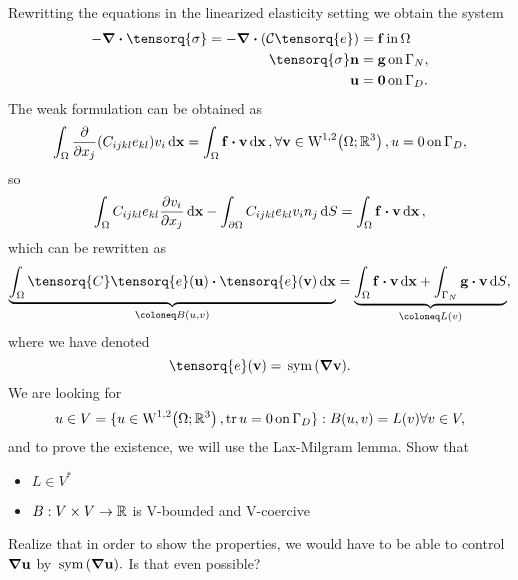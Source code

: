 \documentclass[reqno, a4paper]{article}
\begin{document}
Rewritting the equations in the linearized elasticity setting we obtain the system
\begin{align*}
	-\divergence{\tensorq{\sigma}} = - \divergence{\qty(\mathcal{C}\tensorq{e})} &= \vb{f} \, \text{in} \, \Omega \\
	\tensorq{\sigma}\vb{n} &= \vb{g} \, \text{on} \, \Gamma_{N}, \\
	\vb{u} &= \vb{0} \, \text{on} \, \Gamma_{D}.
\end{align*}
The weak formulation can be obtained as
\[
	\int_{\Omega} \pdv{x_j}\qty(C_{ijkl}e_{kl})v_i \dd{\vb{x}} = \int_{\Omega}\vb{f}\vdot \vb{v}\dd{\vb{x}}, \forall \vb{v} \in \WkpSet[1][2]{\Omega;\R^3}, u=0 \, \text{on} \, \Gamma_D,
\]
so
\[
	\int_{\Omega}C_{ijkl}e_{kl} \pdv{v_i}{x_j}\dd{\vb{x}}-\int_{\partial \Omega}C_{ijkl}e_{kl}v_i n_j \dd{S} = \int_{\Omega}\vb{f}\vdot \vb{v}\dd{\vb{x}},
\]
which can be rewritten as
\[
	\underbrace{\int_{\Omega}\tensorq{C}\tensorq{e}\qty(\vb{u}) \vdot \tensorq{e}\qty(\vb{v})\dd{\vb{x}}}_{\coloneq B\qty(u,v)} = \underbrace{\int_{\Omega}\vb{f} \vdot \vb{v}\dd{\vb{x}} + \int_{\Gamma_N}\vb{g}\vdot \vb{v}\dd{S}}_{\coloneq L(v)},
\]
where we have denoted
\[
	\tensorq{e}\qty(\vb{v}) = \, \text{sym} \,\qty(\grad \vb{v}).
\]
We are looking for
\[
	u \in V = \{ u \in \WkpSet[1][2]{\Omega; \R^3}, \tr u = 0 \, \text{on} \,\Gamma_D\}: B\qty(u,v) = L(v) \forall v \in V,
\]
and to prove the existence, we will use the Lax-Milgram lemma. Show that
\begin{itemize}
	\item $L \in V^{*}$
	\item $B:V \times V \to {\mathbb R}$ is V-bounded and V-coercive
\end{itemize}
Realize that in order to show the properties, we would have to be able to control $\grad \vb{u}$ by $\, \text{sym} \,\qty(\grad \vb{u}).$ Is that even possible?
\end{document}
